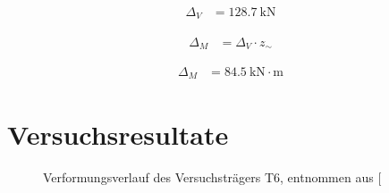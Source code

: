 \documentclass[
  11pt,
  letterpaper,
]{scrreprt}
\begin{document}
$$
\begin{aligned}
\Delta_{V} &= 128.7\ \mathrm{kN} \;
\end{aligned}
$$

$$
\begin{aligned}
\Delta_{M} &= \Delta_{V} \cdot z_{\sim} \; 
\end{aligned}
$$

$$
\begin{aligned}
\Delta_{M} &= 84.5\ \mathrm{kN} \cdot \mathrm{m} \;
\end{aligned}
$$

\section{Versuchsresultate}\label{versuchsresultate}

\begin{figure}[H]


\caption{\label{fig-durchbiegung_laengs_t6}Verformungsverlauf des
Versuchsträgers T6, entnommen aus
{[}\citeproc{ref-sigrist_versuche_1993}{5}{]}}

\end{figure}%
\end{document}
